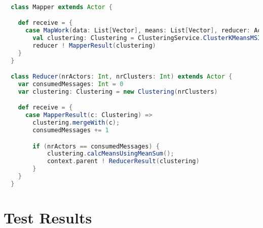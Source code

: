 \begin{lstlisting}[float,label=lst:actor_implementation,
  caption={Actor Implementation},
  language=Scala,  
  showspaces=false,
  showtabs=false,
  breaklines=true,
  showstringspaces=false,
  breakatwhitespace=true,
  commentstyle=\color{greencomments},
  keywordstyle=\color{bluekeywords},
  stringstyle=\color{redstrings}]  % Start your code-block

  class Mapper extends Actor {

    def receive = {
      case MapWork(data: List[Vector], means: List[Vector], reducer: ActorRef) =>
        val clustering: Clustering = ClusteringService.ClusterKMeansMSIncremental(data, means)
        reducer ! MapperResult(clustering)
    }
  }

  class Reducer(nrActors: Int, nrClusters: Int) extends Actor {
    var consumedMessages: Int = 0
    var clustering: Clustering = new Clustering(nrClusters)

    def receive = {
      case MapperResult(c: Clustering) =>
        clustering.mergeWith(c);
        consumedMessages += 1

        if (nrActors == consumedMessages) {
            clustering.calcMeansUsingMeanSum();
            context.parent ! ReducerResult(clustering)
        }
    }
  }  
\end{lstlisting}


\section{Test Results}


